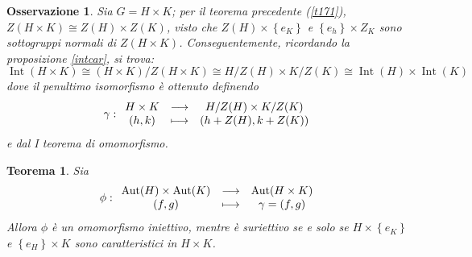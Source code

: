 \documentclass[11pt]{article}
\theoremstyle{style}
\newtheorem{teorema}{Teorema}[section]
\newtheorem{osservazione}{Osservazione}[section]
\numberwithin{equation}{subsection}
\begin{document}
\begin{osservazione}
	Sia $G = H \times K$; per il teorema precedente (\ref{t171}), $Z(H \times  K) \cong Z(H) \times Z(K)$, visto che $Z(H) \times \left\{ e_K \right\} $ e $\left\{ e_h \right\} \times Z_K$ sono sottogruppi normali di $Z(H\times K)$.
	Conseguentemente, ricordando la proposizione \ref{intcar}, si trova:
	\[
	\operatorname{Int} (H \times K) \cong (H\times K )/ Z(H\times K)\cong H / Z(H) \times K / Z(K)\cong \operatorname{Int} (H) \times \operatorname{Int} (K)
	\] 
	dove il penultimo isomorfismo \`e ottenuto definendo
	\[
	\gamma :
	\begin{array}
		{c c c}
		H \times K & \longrightarrow &H / Z(H) \times K / Z(K)\\
		(h,k) & \longmapsto & \left(h + Z(H) , k + Z(K)\right) 
	\end{array}
	\] 
	e dal I teorema di omomorfismo.
\end{osservazione}
\begin{teorema}
	Sia
	\[
	\phi : 
	\begin{array}
		{c c c}
		\operatorname{Aut} (H) \times \operatorname{Aut} (K) & \longrightarrow & \operatorname{Aut} (H \times K)\\
		(f,g) & \longmapsto & \gamma = (f,g)
	\end{array}
	\] 
	Allora $\phi $ \`e un omomorfismo iniettivo, mentre \`e suriettivo se e solo se $H \times \left\{ e_K \right\} $ e $\left\{ e_H \right\} \times K$ sono caratteristici in $H\times K$.
\end{teorema}
\end{document}

